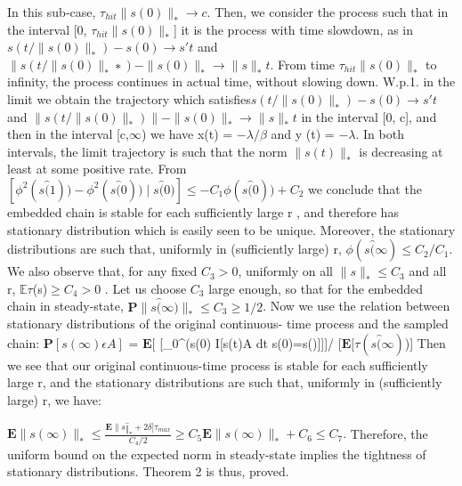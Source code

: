 \newline In this sub-case, $\tau_{hit} \|s(0)\|_\ast \rightarrow c.$ Then, we consider the process such that in the interval [0, $\tau_{hit} \|s(0)\|_\ast$] it is the process with time slowdown, as in  $s(t/ \|s(0)\|_\ast) - s(0) \rightarrow s \prime t $ and $\|s(t/\|s(0)\| _\ast∗) - \|s(0)\|_\ast \rightarrow  \|s\| _\ast t.$ From time $\tau_{hit}\|s(0)\|_\ast$ to infinity, the process continues in actual time, without slowing down. W.p.1. in the limit we obtain the trajectory which satisfies\newline $s(t/\|s(0)\|_\ast) − s(0) \rightarrow s\prime t $ and $\|s(t/\|s(0)\|_\ast)\| - \|s(0)\|_\ast \rightarrow \|s\|_\ast t $ in the interval [0, c], and then in the interval [c,$\infty$) we have x(t) = $-\lambda/\beta $ and y \prime(t) = $-\lambda$. In both intervals, the limit trajectory is such that the norm $\|s(t)\|_\ast$ is decreasing at least at some positive rate. \newline\newline
From $[\phi^2(s \hat(1)) - \phi^2(s\hat(0)) \mid s \hat(0)] \leq  -  C_1 \phi(s \hat(0)) + C_2$ we conclude that the embedded chain is stable for each sufficiently large r , and therefore has stationary distribution which is easily seen to be unique. Moreover, the stationary distributions are such that, uniformly in (sufficiently large) r, $\phi( s\hat(\infty) \leq C_2/C_1$.
\newline \newline We also observe that, for any fixed $C_3 > 0$, uniformly on all $\|s\|_\ast \leq C_3$ and all r, $\mathbb{E} \tau $(s)$ \geq C_4 > 0$ . Let us choose $C_3$ large enough, so that for the embedded chain in steady-state, $\mathbf{P}{\|s\hat(\infty)\|_\ast\leq C_3}\geq 1/2 $.
\newline \newline
Now we use the relation between stationary distributions of the original continuous- time process and the sampled chain: \newline
$\mathbf{P}[s(\infty) \epsilon A] $ = $\mathbf{E}[ $ [\int_{0}^{\tau(s(0)} I[s(t)\epsilon A dt \mid s(0)=s\hat(\infty)]]]/ [$\mathbf{E}[\tau(s\hat(\infty)$)]
\newline 
Then we see that our original continuous-time process is stable for each sufficiently large r, and the stationary distributions are such that, uniformly in (sufficiently large) r, we have: \newline

$\mathbf{E} \|s(\infty)\| _\ast \leq \frac {\mathbf{E} \|s\hat\| _\ast + 2\delta] \tau_{max}} {C_4/2} \geq C_5 \mathbf{E}\|s(\infty)\|_\ast + C_6 \leq C_7.$
\newline Therefore, the uniform bound on the expected norm in steady-state implies the tightness of stationary distributions.  Theorem 2 is thus, proved.	

